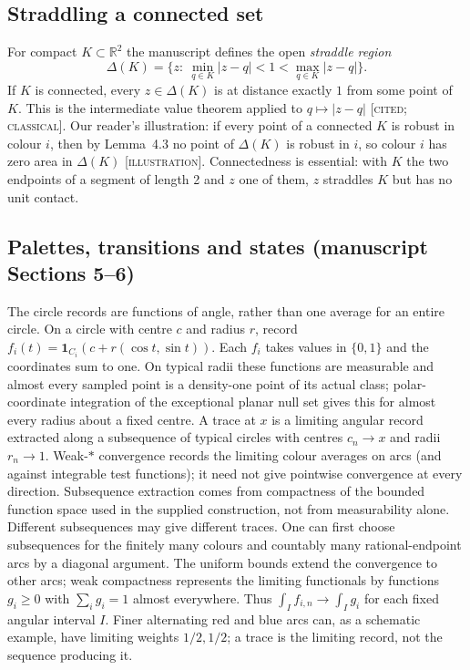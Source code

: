 \documentclass[11pt]{article}
\theoremstyle{definition}
\theoremstyle{remark}
\newcommand{\R}{\mathbb{R}}
\newcommand{\st}[1]{\textsc{[#1]}}
\begin{document}
\subsection{Straddling a connected set}
For compact $K\subset\R^2$ the manuscript defines the open \emph{straddle region}
\[
\Delta(K)=\{z:\ \min_{q\in K}|z-q|<1<\max_{q\in K}|z-q|\}.
\]
If $K$ is connected, every $z\in\Delta(K)$ is at distance exactly $1$ from some point of $K$. This is the intermediate value theorem applied to $q\mapsto|z-q|$ \st{cited; classical}. Our reader's illustration: if every point of a connected $K$ is robust in colour $i$, then by Lemma~4.3 no point of $\Delta(K)$ is robust in $i$, so colour $i$ has zero area in $\Delta(K)$ \st{illustration}. Connectedness is essential: with $K$ the two endpoints of a segment of length 2 and $z$ one of them, $z$ straddles $K$ but has no unit contact.

\subsection{Palettes, transitions and states (manuscript Sections 5--6)}
The circle records are functions of angle, rather than one average for an entire
circle. On a circle with centre $c$ and radius $r$, record
$f_i(t)=\mathbf{1}_{C_i}(c+r(\cos t,\sin t))$. Each $f_i$ takes values in
$\{0,1\}$ and the coordinates sum to one. On typical radii these functions
are measurable and almost every sampled point is a density-one point of its
actual class; polar-coordinate integration of the exceptional planar null set
gives this for almost every radius about a fixed centre.
A trace at $x$ is a limiting angular record extracted along a subsequence of
typical circles with centres $c_n\to x$ and radii $r_n\to1$. Weak-$*$ convergence records the limiting colour
averages on arcs (and against integrable test functions); it need not give
pointwise convergence at every direction. Subsequence extraction comes from
compactness of the bounded function space used in the supplied construction,
not from measurability alone. Different subsequences may give different traces.
One can first choose subsequences for the finitely many colours and countably
many rational-endpoint arcs by a diagonal argument. The uniform bounds extend
the convergence to other arcs; weak compactness represents the limiting
functionals by functions $g_i\ge0$ with $\sum_i g_i=1$ almost everywhere.
Thus $\int_I f_{i,n}\to\int_I g_i$ for each fixed angular interval $I$.
Finer alternating red and blue arcs can, as a schematic example, have limiting
weights $1/2,1/2$; a trace is the limiting record, not the sequence producing it.
\end{document}

